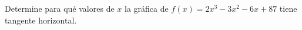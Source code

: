\item Determine para qué valores de $x$ la gráfica de $f(x) = 2x^3 - 3x^2 - 6x + 87$ tiene tangente horizontal.
